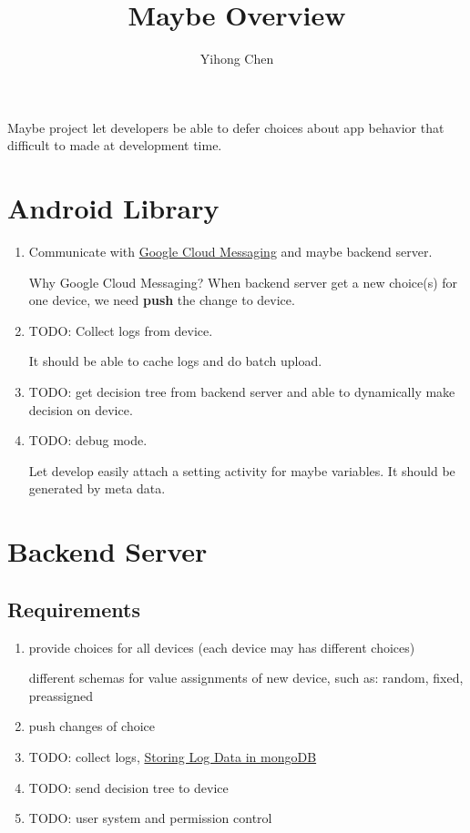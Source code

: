 \documentclass{article}
\title{Maybe Overview}
\author{Yihong Chen}
\date{}
\begin{document}
\maketitle

Maybe project let developers be able to defer choices about app behavior that difficult to made at development time.
\section{Android Library}
\label{sec:android-library}
\begin{enumerate}[label=\alph*.]
\item Communicate with \href{https://developer.android.com/google/gcm/index.html}{Google Cloud Messaging} and maybe backend server.

Why Google Cloud Messaging? When backend server get a new choice(s) for one device, we need \textbf{push} the change to device.
\item TODO: Collect logs from device.

It should be able to cache logs and do batch upload.
\item TODO: get decision tree from backend server and able to dynamically make decision on device.

\item TODO: debug mode.

Let develop easily attach a setting activity for maybe variables. It should be generated by meta data.
\end{enumerate}

\section{Backend Server}
\label{sec:backend-server}

\subsection{Requirements}
\label{sec:requirements}

\begin{enumerate}[label=\alph*.]
\item provide choices for all devices (each device may has different choices)

different schemas for value assignments of new device, such as: random,
fixed, preassigned
\item push changes of choice
\item TODO: collect logs, \href{http://docs.mongodb.org/ecosystem/use-cases/storing-log-data/}{Storing Log Data in mongoDB}
\item TODO: send decision tree to device
\item TODO: user system and permission control
\end{enumerate}
\end{document}
